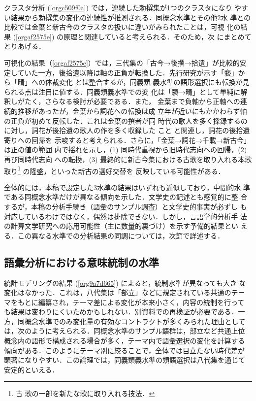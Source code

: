\documentclass[submit]{ipsj}
\renewcommand{\ref}{\cref}
\begin{document}
クラスタ分析 (\ref{orgc509f0a}) では，連続した勅撰集が1つのクラスタになり
やすい結果から勅撰集の変化の連続性が推測される．同概念水準とその他2水
準との比較では金葉と新古今のクラスタの扱いに違いがみられたことは，可視
化の結果 (\ref{orgaf2575e}) の原理と関連していると考えられる．そのため，次
にまとめてとりあげる．

可視化の結果（\ref{orgaf2575e}）では，三代集の「古今→後撰→拾遺」が比較的安
定していた一方，後拾遺以降は軸の正負が転換した．先行研究が示す「褻」か
ら「晴」への体裁変化 \cite{ueno1976Koshui} とは整合するが，同義類
義水準の語形選択にも転換が見られる点は注目に値する．同義類義水準での変
化は「褻→晴」として単純に解釈しがたく，さらなる検討が必要である．また，
金葉まで負軸から正軸への連続的推移があったが，金葉から詞花への転換は成
立年が近いにもかかわらず軸の正負が初めて反転した．これは金葉の撰者が同
時代の歌人を多く採録するのに対し，詞花が後拾遺の歌人の作を多く収録した
こと \cite{matsuda1939Shika} と関連し，詞花の後拾遺寄りへの回帰を
示唆すると考えられる．さらに，「金葉→詞花→千載→新古今」は正の値の範囲
内で揺れを示し，(1) 同時代重視から旧時代志向への回帰，(2) 再び同時代志向
への転換，(3) 最終的に新古今集における古歌を取り入れる本歌取り\footnote{古
歌の一部を新たな歌に取り入れる技法．} の隆盛，といった新古の選好交替を
反映している可能性がある．

全体的には，本稿で設定した3水準の結果はいずれも近似しており，中間的水
準である同概念水準だけが異なる傾向を示した．文学史の記述とも感覚的に整
合するが，本稿の分析手続き（語彙のサンプル調査）と文学史的事実が必ずし
も対応しているわけではなく，偶然は排除できない．しかし，言語学的分析手
法の計算文学研究への応用可能性（主に数量的裏づけ）を示す予備的結果とい
える．この異なる水準での分析結果の同調については，次節で詳述する．
\subsection{語彙分析における意味統制の水準\label{org11c8ebb}}
\label{sec:orgf2f3f8b}
統計モデリングの結果 (\ref{org9a7d665}) によると，統制水準が異なっても大き
な変化はなかった．これは，八代集は「部立」などに規定されている共通のテー
マをもとに編纂され，テーマ差による変化が本来小さく，内容の統制を行って
も結果は変わりにくいためかもしれない．別資料での再検証が必要である．一
方，同概念水準でのみ変化量の有効なコントラクトが多くみられた理由として
は，次のように考えられる．同概念水準のサンプル語群は，部立など共通上位
概念内の語形で構成される場合が多く，テーマ内で語彙選択の変化を計算する
傾向がある．このようにテーマ別に絞ることで，全体では目立たない時代差が
顕著になりやすい．この論理では，同義類義水準の類語選択は八代集を通じて
安定的といえる．
\end{document}
